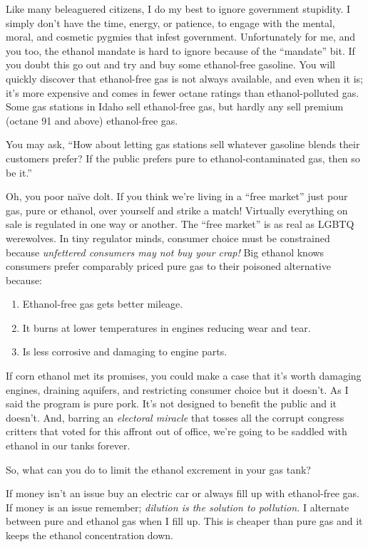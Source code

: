 Like many beleaguered citizens, I do my best to ignore government
stupidity. I simply don't have the time, energy, or patience, to engage
with the mental, moral, and cosmetic pygmies that infest government.
Unfortunately for me, and you too, the ethanol mandate is hard to ignore
because of the ``mandate'' bit. If you doubt this go out and try and buy
some ethanol-free gasoline. You will quickly discover that ethanol-free
gas is not always available, and even when it is; it's more expensive
and comes in fewer octane ratings than ethanol-polluted gas. Some gas
stations in Idaho sell ethanol-free gas, but hardly any sell premium
(octane 91 and above) ethanol-free gas.

You may ask, ``How about letting gas stations sell whatever gasoline
blends their customers prefer? If the public prefers pure to
ethanol-contaminated gas, then so be it.''

Oh, you poor naïve dolt. If you think we're living in a ``free market''
just pour gas, pure or ethanol, over yourself and strike a match!
Virtually everything on sale is regulated in one way or another. The
``free market'' is as real as LGBTQ werewolves. In tiny regulator minds,
consumer choice must be constrained because \emph{unfettered consumers
may not buy your crap!} Big ethanol knows consumers prefer comparably
priced pure gas to their poisoned alternative because:

\begin{enumerate}
\def\labelenumi{\arabic{enumi}.}
\tightlist
\item
  Ethanol-free gas gets better mileage.
\item
  It burns at lower temperatures in engines reducing wear and tear.
\item
  Is less corrosive and damaging to engine parts.
\end{enumerate}

If corn ethanol met its promises, you could make a case that it's worth
damaging engines, draining aquifers, and restricting consumer choice but
it doesn't. As I said the program is pure pork. It's not designed to
benefit the public and it doesn't. And, barring an \emph{electoral
miracle} that tosses all the corrupt congress critters that voted for
this affront out of office, we're going to be saddled with ethanol in
our tanks forever.

So, what can you do to limit the ethanol excrement in your gas tank?

If money isn't an issue buy an electric car or always fill up with
ethanol-free gas. If money is an issue remember; \emph{dilution is the
solution to pollution.} I alternate between pure and ethanol gas when I
fill up. This is cheaper than pure gas and it keeps the ethanol
concentration down.

